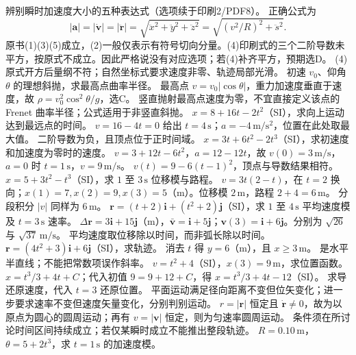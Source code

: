 \problemtext 辨别瞬时加速度大小的五种表达式（选项续于印刷2/PDF8）。
\workings 正确公式为
\[
|\bm a|=|\dot{\bm v}|=|\ddot{\bm r}|=\sqrt{\ddot x^2+\ddot y^2+\ddot z^2}
=\sqrt{(v^2/R)^2+\ddot s^2}.
\]
原书(1)(3)(5)成立，(2)一般仅表示有符号切向分量。(4)印刷式的三个二阶导数未平方，按原式不成立。因此严格说没有对应选项；若(4)补齐平方，预期选D。
\crosscheck (4)原式开方后量纲不符；自然坐标式要求速度非零、轨迹局部光滑。
\problemtext 初速 $v_0$、仰角 $\theta$ 的理想斜抛，求最高点曲率半径。
\workings 最高点 $v=v_0|\cos\theta|$，重力加速度垂直于速度，故 $\rho=v_0^2\cos^2\theta/g$，选C。
\crosscheck 竖直抛射最高点速度为零，不宜直接定义该点的 Frenet 曲率半径；公式适用于非竖直斜抛。
\problemtext $x=8+16t-2t^2$（SI），求向上运动达到最远点的时间。
\workings $v=16-4t=0$ 给出 $t=4\,\mathrm s$；$a=-4\,\mathrm{m/s^2}$，位置在此处取最大值。
\crosscheck 二阶导数为负，且顶点位于正时间域。
\problemtext $x=3t+6t^2-2t^3$（SI），求初速度和加速度为零时的速度。
\workings $v=3+12t-6t^2$，$a=12-12t$，故 $v(0)=3\,\mathrm{m/s}$，$a=0$ 时 $t=1\,\mathrm s$，$v=9\,\mathrm{m/s}$。
\crosscheck $v(t)=9-6(t-1)^2$，顶点与导数结果相符。
\problemtext $x=5+3t^2-t^3$（SI），求 $1$ 至 $3\,\mathrm s$ 位移模与路程。
\workings $v=3t(2-t)$，在 $t=2$ 换向；$x(1)=7,x(2)=9,x(3)=5$（m）。位移模 $2\,\mathrm m$，路程 $2+4=6\,\mathrm m$。
\crosscheck 分段积分 $|v|$ 同样为 $6\,\mathrm m$。
\problemtext $\bm r=(t+2)\bm i+(t^2+2)\bm j$（SI），求 $1$ 至 $4\,\mathrm s$ 平均速度模及 $t=3\,\mathrm s$ 速率。
\workings $\Delta\bm r=3\bm i+15\bm j$（m），$\bar{\bm v}=\bm i+5\bm j$；$\bm v(3)=\bm i+6\bm j$。分别为 $\sqrt{26}$ 与 $\sqrt{37}\,\mathrm{m/s}$。
\crosscheck 平均速度取位移除以时间，而非弧长除以时间。
\problemtext $\bm r=(4t^2+3)\bm i+6\bm j$（SI），求轨迹。
\workings 消去 $t$ 得 $y=6$（m），且 $x\ge3\,\mathrm m$。
\crosscheck 是水平半直线；不能把常数项误作斜率。
\problemtext $v=t^2+4$（SI），$x(3)=9\,\mathrm m$，求位置函数。
\workings $x=t^3/3+4t+C$；代入初值 $9=9+12+C$，得 $x=t^3/3+4t-12$（SI）。
\crosscheck 求导还原速度，代入 $t=3$ 还原位置。
\problemtext 平面运动满足径向距离不变但位矢变化；进一步要求速率不变但速度矢量变化，分别判别运动。
\workings $r=|\bm r|$ 恒定且 $\dot{\bm r}\ne0$，故为以原点为圆心的圆周运动；再有 $v=|\bm v|$ 恒定，则为匀速率圆周运动。
\crosscheck 条件须在所讨论时间区间持续成立；若仅某瞬时成立不能推出整段轨迹。
\problemtext $R=0.10\,\mathrm m$，$\theta=5+2t^3$，求 $t=1\,\mathrm s$ 的加速度模。
